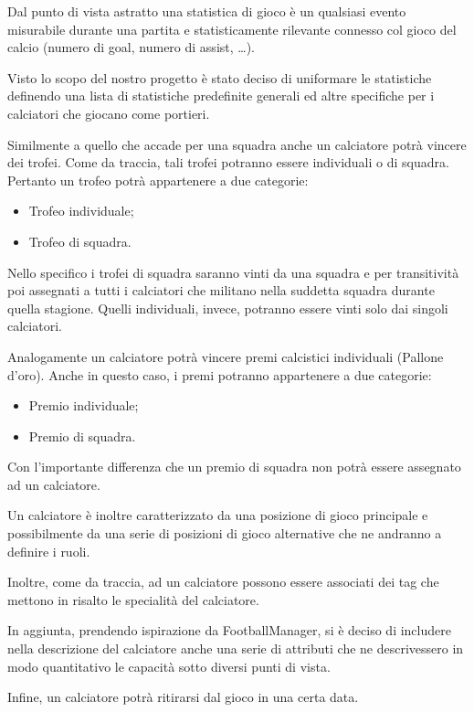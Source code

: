Dal punto di vista astratto una statistica di gioco è un qualsiasi evento misurabile durante
una partita e statisticamente rilevante connesso col gioco del calcio
(numero di goal, numero di assist, \dots).

Visto lo scopo del nostro progetto è stato deciso di uniformare le statistiche definendo una
lista di statistiche predefinite generali ed altre specifiche per i calciatori che giocano
come portieri.

Similmente a quello che accade per una squadra anche un calciatore potrà vincere dei trofei.
Come da traccia, tali trofei potranno essere individuali o di squadra.
Pertanto un trofeo potrà appartenere a due categorie:
\begin{itemize}
	\item Trofeo individuale;
	\item Trofeo di squadra.
\end{itemize}

Nello specifico i trofei di squadra saranno vinti da una squadra e per transitività poi
assegnati a tutti i calciatori che militano nella suddetta squadra durante quella stagione.
Quelli individuali, invece, potranno essere vinti solo dai singoli calciatori.

Analogamente un calciatore potrà vincere premi calcistici individuali (Pallone d'oro).
Anche in questo caso, i premi potranno appartenere a due categorie:
\begin{itemize}
	\item Premio individuale;
	\item Premio di squadra.
\end{itemize}

Con l'importante differenza che un premio di squadra non potrà essere assegnato ad un
calciatore.

Un calciatore è inoltre caratterizzato da una posizione di gioco principale e possibilmente da una
serie di posizioni di gioco alternative che ne andranno a definire i ruoli.

Inoltre, come da traccia, ad un calciatore possono essere associati dei tag che mettono in
risalto le specialità del calciatore.

In aggiunta, prendendo ispirazione da FootballManager, si è deciso di includere nella
descrizione del calciatore anche una serie di attributi che ne descrivessero in modo quantitativo
le capacità sotto diversi punti di vista.

Infine, un calciatore potrà ritirarsi dal gioco in una certa data.


